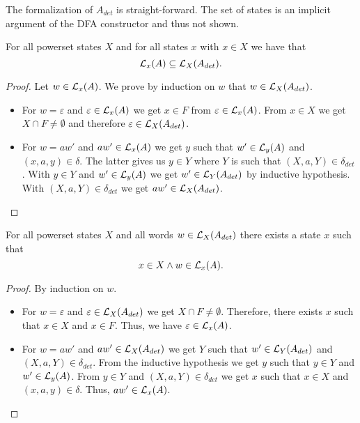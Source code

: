 The formalization of $A_{det}$ is straight-forward. 
The set of states is an implicit argument of the DFA constructor and thus not shown.


\begin{lemma}
    \label{nfa_to_dfa_aux2}
    For all powerset states $X$ and for all states $x$ with $x \in X$ we have that
    \begin{equation*}
        \mathcal{L}_{x}(A) \subseteq \mathcal{L}_{X}(A_{det}).
    \end{equation*}
\end{lemma}

\begin{proof}
    Let $w \in \mathcal{L}_{x}(A)$. We prove by induction on $w$ that $w \in \mathcal{L}_{X}(A_{det})$. 
    \begin{itemize}
        \item
            For $w = \varepsilon$ and $\varepsilon \in \mathcal{L}_{x}(A)$ we get $x \in F$ from $\varepsilon \in \mathcal{L}_{x}(A)$. 
            From $x \in X$ we get $X \cap F \neq \emptyset$ and therefore $\varepsilon \in \mathcal{L}_{X}(A_{det})$.
        \item
            For $w = a w'$ and $a w' \in \mathcal{L}_{x}(A)$ we get $y$ such that $w' \in \mathcal{L}_{y}(A)$ and $(x,a,y) \in \delta$.
            The latter gives us $y \in Y$ where $Y$ is such that $(X, a, Y) \in \delta_{det}$.
            With $y \in Y$ and $w' \in \mathcal{L}_{y}(A)$ we get $w' \in \mathcal{L}_{Y}(A_{det})$ by inductive hypothesis.
            With $(X, a, Y) \in \delta_{det}$ we get $a w' \in \mathcal{L}_{X}(A_{det})$.
    \end{itemize}
\end{proof}


\begin{lemma}
    \label{nfa_to_dfa_aux1}
    For all powerset states $X$ and all words $w \in \mathcal{L}_{X}(A_{det})$ there exists a state $x$ such that 
    \begin{equation*}
        x \in X \wedge
        w \in \mathcal{L}_{x}(A).
    \end{equation*}
\end{lemma}

\begin{proof}
    By induction on $w$. %
    \begin{itemize}
        \item
            For $w = \varepsilon$ and $\varepsilon \in \mathcal{L}_{X}(A_{det})$ we get  $X \cap F \neq \emptyset$.
            Therefore, there exists $x$ such that $x \in X$ and $x \in F$.
            Thus, we have $\varepsilon \in \mathcal{L}_{x}(A)$.
        \item
            For $w = a w'$ and $a w' \in \mathcal{L}_{X}(A_{det})$ we get $Y$ such that $w' \in \mathcal{L}_{Y}(A_{det})$ and $(X,a,Y) \in \delta_{det}$.
            From the inductive hypothesis we get $y$ such that $y \in Y$ and $w' \in \mathcal{L}_{y}(A)$.
            From $y \in Y$ and $(X, a, Y) \in \delta_{det}$ we get $x$ such that $x \in X$ and $(x, a, y) \in \delta$.
            Thus, $a w' \in \mathcal{L}_{x}(A)$.
    \end{itemize}
\end{proof}

